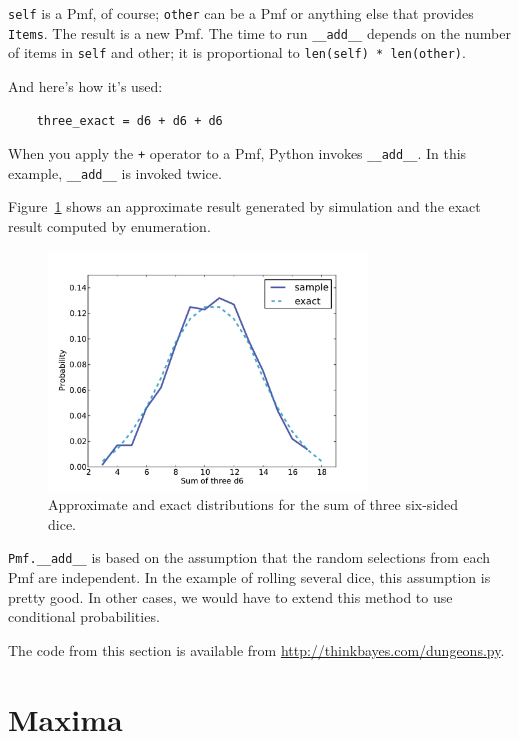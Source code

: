 \documentclass[12pt]{book}
\begin{document}
{\tt self} is a Pmf, of course; {\tt other} can be a Pmf or anything
else that provides {\tt Items}.  The result is a new Pmf.  The time to
run \verb"__add__" depends on the number of items in {\tt self} and
other; it is proportional to {\tt len(self) * len(other)}.

And here's how it's used:

\begin{verbatim}
    three_exact = d6 + d6 + d6
\end{verbatim}

When you apply the {\tt +} operator to a Pmf, Python invokes
\verb"__add__".  In this example, \verb"__add__" is invoked twice.

Figure~\ref{fig.dungeons1} shows an approximate result generated
by simulation and the exact result computed by enumeration.

\begin{figure}
\centerline{\includegraphics[height=2.5in]{figs/dungeons1.pdf}}
\caption{Approximate and exact distributions for the sum of
three six-sided dice.}
\label{fig.dungeons1}
\end{figure}

\verb"Pmf.__add__" is based on the assumption that the random
selections from each Pmf are independent.  In the example of rolling
several dice, this assumption is pretty good.  In other cases, we
would have to extend this method to use conditional probabilities.

The code from this section is available from
\url{http://thinkbayes.com/dungeons.py}.


\section{Maxima}
\end{document}
